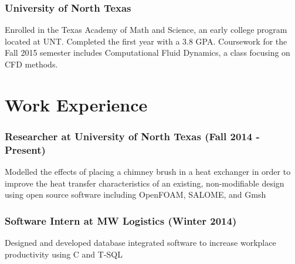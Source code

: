 \documentclass[11pt, letterpaper]{article}
\newcommand{\csharp}[0]{C\raisebox{.11em}{\footnotesize{\textbf{\#}}}}
\begin{document}
\subsubsection*{University of North Texas}
Enrolled in the Texas Academy of Math and Science, an early college program located at UNT. Completed the first year with a 3.8 GPA.
Coursework for the Fall 2015 semester includes Computational Fluid Dynamics, a class focusing on CFD methods.


\section*{Work Experience}
\subsubsection*{Researcher at University of North Texas (Fall 2014 - Present)}
Modelled the effects of placing a chimney brush in a heat exchanger in order to improve the heat transfer characteristics of an existing, non-modifiable design using open source software including OpenFOAM, SALOME, and Gmsh
\subsubsection*{Software Intern at MW Logistics (Winter 2014)}
Designed and developed database integrated software to increase workplace productivity using \csharp{} and T-SQL
\end{document}
